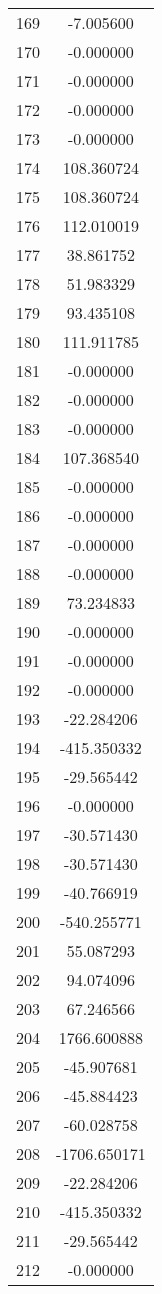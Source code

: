 \documentclass[12pt]{article}
\begin{document}
\begin{longtable}{@{}cc@{}}
169 & -7.005600 \\
170 & -0.000000 \\
171 & -0.000000 \\
172 & -0.000000 \\
173 & -0.000000 \\
174 & 108.360724 \\
175 & 108.360724 \\
176 & 112.010019 \\
177 & 38.861752 \\
178 & 51.983329 \\
179 & 93.435108 \\
180 & 111.911785 \\
181 & -0.000000 \\
182 & -0.000000 \\
183 & -0.000000 \\
184 & 107.368540 \\
185 & -0.000000 \\
186 & -0.000000 \\
187 & -0.000000 \\
188 & -0.000000 \\
189 & 73.234833 \\
190 & -0.000000 \\
191 & -0.000000 \\
192 & -0.000000 \\
193 & -22.284206 \\
194 & -415.350332 \\
195 & -29.565442 \\
196 & -0.000000 \\
197 & -30.571430 \\
198 & -30.571430 \\
199 & -40.766919 \\
200 & -540.255771 \\
201 & 55.087293 \\
202 & 94.074096 \\
203 & 67.246566 \\
204 & 1766.600888 \\
205 & -45.907681 \\
206 & -45.884423 \\
207 & -60.028758 \\
208 & -1706.650171 \\
209 & -22.284206 \\
210 & -415.350332 \\
211 & -29.565442 \\
212 & -0.000000 \\

\end{longtable}
\end{document}
